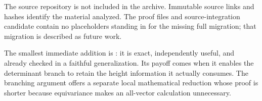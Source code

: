 The source repository is not included in the archive. Immutable source
links and hashes identify the material analyzed. The proof files and
source-integration candidate contain no placeholders standing in for
the missing full migration; that migration is described as future work.

The smallest immediate addition is : it is exact,
independently useful, and already checked in a faithful generalization.
Its payoff comes when it enables the determinant branch to retain the
height information it actually consumes. The branching argument offers
a separate local mathematical reduction whose proof is shorter because
equivariance makes an all-vector calculation unnecessary.
